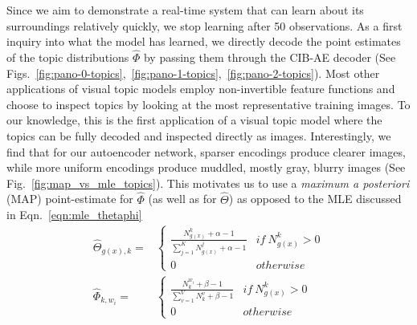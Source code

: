 Since we aim to demonstrate a real-time system that can learn about its surroundings relatively quickly, we stop learning after 50 observations. As a first inquiry into what the model has learned, we directly decode the point estimates of the topic distributions $\hat{\Phi}$ by passing them through the CIB-AE decoder (See Figs.~\ref{fig:pano-0-topics},~\ref{fig:pano-1-topics},~\ref{fig:pano-2-topics}). Most other applications of visual topic models employ non-invertible feature functions and choose to inspect topics by looking at the most representative training images. To our knowledge, this is the first application of a visual topic model where the topics can be fully decoded and inspected directly as images. Interestingly, we find that for our autoencoder network, sparser encodings produce clearer images, while more uniform encodings produce muddled, mostly gray, blurry images (See Fig.~\ref{fig:map_vs_mle_topics}). This motivates us to use a \emph{maximum a posteriori} (MAP) point-estimate for $\hat{\Phi}$ (as well as for $\hat{\Theta}$) as opposed to the MLE discussed in Eqn.~\ref{eqn:mle_thetaphi}
\begin{equation} \label{eqn:map_thetaphi}
\begin{split}
\hat{\Theta}_{g(x), k} =&
    \begin{cases}
        \frac{N^k_{g(x)} + \alpha - 1}{\sum_{j=1}^K N^j_{g(x)} + \alpha - 1} & if~N^k_{g(x)} > 0 \\
        0 & otherwise
    \end{cases} \\
\hat{\Phi}_{k, w_i} =&
    \begin{cases}
        \frac{N^{w_i}_k + \beta - 1}{\sum_{v=1}^V N^v_k + \beta - 1} & if~N^k_{g(x)} > 0 \\
        0 & otherwise
    \end{cases}
\end{split}
\end{equation}

